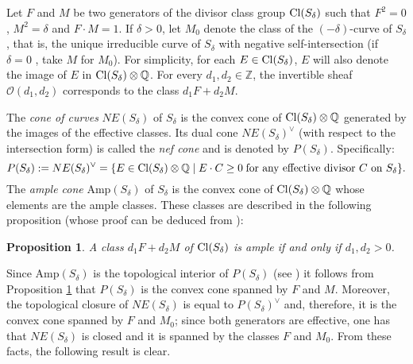 \documentclass{amsart} %
\newtheorem{proposition}[theorem]{Proposition}
\theoremstyle{definition}
\newcommand{\mcO}{\mathcal{O}}
\begin{document}
 Let $F$ and $M$ be two generators of the
 divisor class group %
 ${\rm Cl}(S_{\delta})$ such that
 $F^2=0$, $M^2=\delta$ and $F\cdot M=1$. If $\delta>0$, let
 $M_0$ denote the class of the $(-\delta)$-curve of $S_{\delta}$,  that is,
 the unique irreducible curve of $S_{\delta}$ with negative self-intersection
 (if $\delta=0$ , take $ M $ for $ M_0 $). For simplicity, for each $E\in {\rm Cl}(S_{\delta})$,
 $E$ will also denote the image of $E$ in ${\rm Cl}(S_{\delta})\otimes \mathbb{Q}$. For
 every $ d_1, d_2\in \mathbb{Z} $, the invertible sheaf $\mcO(d_1, d_2)$ corresponds to the class
 $ d_1 F + d_2 M $.

The \emph{cone of curves} $NE(S_{\delta})$ of $S_{\delta}$ is the convex cone of
${\rm Cl}(S_{\delta})\otimes \mathbb{Q}$
generated by the images of the effective classes.
Its dual cone  $NE(S_{\delta})^\vee$ (with respect to the intersection form) is called the
\emph{nef cone} and is denoted by $P(S_{\delta})$. Specifically:
\[
 P(S_{\delta}):=NE(S_{\delta})^\vee=\{E\in {\rm Cl}(S_{\delta})\otimes \mathbb{Q}\mid E\cdot C\geq 0\;
 \mbox{for any effective divisor $C$ on $S_{\delta}$}\}.
\]
The \emph{ample cone}
Amp$(S_{\delta})$
of $S_{\delta}$ is the convex cone of
${\rm Cl}(S_{\delta})\otimes \mathbb{Q}$
whose elements are the ample classes. These classes are described in the following proposition
(whose proof can be deduced from \cite[Chapter V, Corollary 2.18]{Hartshorne}):
\begin{proposition}\label{ample}
A class $ d_1 F + d_2 M $ of ${\rm Cl}(S_{\delta})$ is ample if and only if $d_1, d_2 > 0 $.
\end{proposition}

Since Amp$(S_{\delta})$ is the topological interior of $P(S_{\delta})$ (see \cite{Kleiman}) it
follows from Proposition \ref{ample} that $P(S_{\delta})$ is the convex cone spanned by $F$ and $M$.
Moreover, the topological closure of $NE(S_{\delta})$ is equal to $P(S_{\delta})^\vee$ and, therefore,
it is the convex cone spanned by $F$ and $M_0$; since both generators are effective, one has that
$NE(S_{\delta})$ is closed and it is spanned by the classes $F$ and $M_0$.  From these facts, the following
result is clear.
\end{document}
